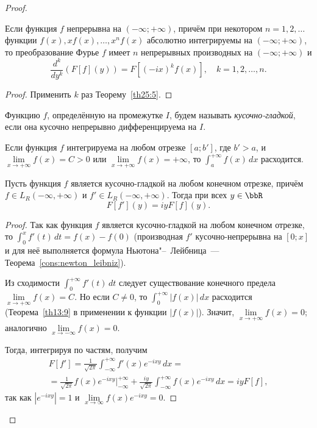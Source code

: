 \begin{proof}
\begin{cons}
Если функция $f$ непрерывна на $(-\infty; +\infty)$, причём при некотором $n = 1, 2, \dots$ функции $f(x), xf(x), \dots, x^n f(x)$ абсолютно интегрируемы на $(-\infty; +\infty)$, то преобразование Фурье $f$ имеет $n$ непрерывных производных на $(-\infty; +\infty)$ и
$$
\frac{d^k}{dy^k}(F[f](y)) = F[(-ix)^k f(x)], \quad k = 1, 2, \dots, n.
$$
\end{cons}

\begin{proof}
Применить $k$ раз Теорему~\ref{th25:5}.
\end{proof}

\begin{defn}
Функцию $f$, определённую на промежутке $I$, будем называть \textit{кусочно-гладкой}, если она кусочно непрерывно дифференцируема на $I$.
\end{defn}

\begin{thm}
\label{th13:9}
Если функция $f$ интегрируема на любом отрезке $[a;b']$, где $b' > a$, и $\lim\limits_{x \to +\infty} f(x) = C > 0$ или $\lim\limits_{x \to +\infty} f(x) = +\infty$, то $\int_{a}^{+\infty} f(x)\,dx$ расходится.
\end{thm}

\begin{thm}
\label{th25:6}
Пусть функция $f$ является кусочно-гладкой на любом конечном отрезке, причём $f \in L_R(-\infty, +\infty)$ и $f' \in L_R(-\infty, +\infty)$. Тогда при всех $y \in \bbR$
$$
F[f'](y) = iy F[f](y).
$$
\end{thm}

\begin{proof}
Так как функция $f$ является кусочно-гладкой на любом конечном отрезке, то $\int_0^x f'(t)\,dt = f(x) - f(0)$ (производная $f'$ кусочно-непрерывна на $[0;x]$ и для неё выполняется формула Ньютона"--~Лейбница~--- Теорема~\ref{cons:newton_leibniz}).

Из сходимости $\int_0^{+\infty} f'(t)\,dt$ следует существование конечного предела $\lim\limits_{x \to +\infty} f(x) = C$. Но если $C \ne 0$, то $\int_0^{+\infty}|f(x)|\,dx$ расходится (Теорема~\ref{th13:9} в применении к функции $|f(x)|$). Значит, $\lim\limits_{x \to +\infty} f(x) = 0$; аналогично $\lim\limits_{x \to -\infty} f(x) = 0$.

Тогда, интегрируя по частям, получим
\begin{multline*}
F[f'] = \frac{1}{\sqrt{2\pi}}\int_{-\infty}^{+\infty} f'(x)e^{-ixy}\,dx = \\
= \frac{1}{\sqrt{2\pi}} f(x)e^{-ixy}\bigg|_{-\infty}^{+\infty}
+ \frac{iy}{\sqrt{2\pi}}\int_{-\infty}^{+\infty} f(x)e^{-ixy}\,dx = iy F[f],
\end{multline*}
так как $|e^{-ixy}| = 1$ и $\lim\limits_{x \to \infty} f(x)e^{-ixy} = 0$.
\end{proof}


\end{proof}
